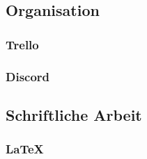 \subsection{Organisation}
\subsubsection {Trello}
\subsubsection {Discord}


\subsection{Schriftliche Arbeit}
\subsubsection {LaTeX}